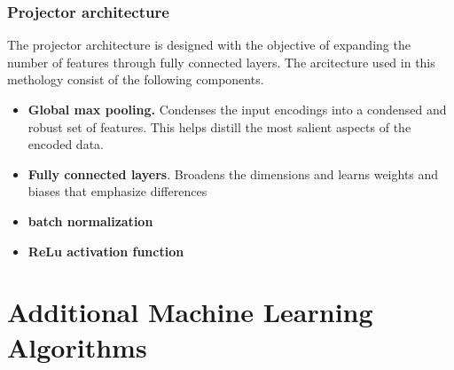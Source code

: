 \subsubsection{Projector architecture}
The projector architecture is designed with the objective of expanding the number of features through fully connected layers. The arcitecture used in this methology consist of the following components.
\begin{itemize}
    \item \textbf{Global max pooling.} Condenses the input encodings into a condensed and robust set of features. This helps distill the most salient aspects of the encoded data.
    \item \textbf{Fully connected layers}. Broadens the dimensions and learns weights and biases that emphasize differences 
    \item \textbf{batch normalization}
    \item \textbf{ReLu activation function}
\end{itemize}


\section{Additional Machine Learning Algorithms}

